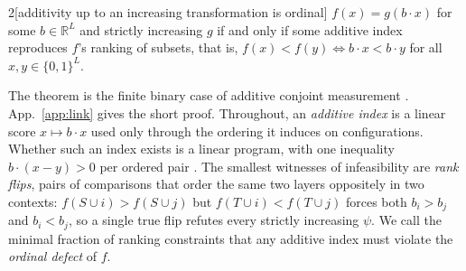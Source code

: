 \begin{customthm}{2}[additivity up to an increasing transformation is ordinal]\label{thm:ordinal}
$f(x) = g(b\cdot x)$ for some $b\in\mathbb{R}^L$ and strictly increasing $g$ if and only if some additive
index reproduces $f$'s ranking of subsets, that is, $f(x) < f(y) \iff b\cdot x < b\cdot y$ for all
$x,y \in \{0,1\}^L$.
\end{customthm}

The theorem is the finite binary case of additive conjoint measurement
\citep{lucetukey1964conjoint,debreu1960topological}. App.~\ref{app:link} gives the
short proof. Throughout, an \emph{additive index} is a linear score $x \mapsto b\cdot x$ used only
through the ordering it induces on configurations. Whether such an index exists is a linear program, with one inequality
$b\cdot(x-y)>0$ per
ordered pair \citep{scott1964measurement}. The smallest witnesses of infeasibility are \emph{rank flips},
pairs of comparisons that order the same two layers oppositely in two contexts:
$f(S\cup i) > f(S\cup j)$ but $f(T\cup i) < f(T\cup j)$ forces both $b_i>b_j$ and $b_i<b_j$, so a single
true flip refutes every strictly increasing $\psi$. We call the minimal fraction of ranking
constraints that any additive index must violate the \emph{ordinal defect} of $f$.

